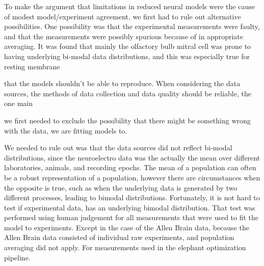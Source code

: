 To make the argument that limitations in reduced neural models were the cause of modest model/experiment agreement, we first had to rule out alternative possibilities. One possibility was that the experimental measurements were faulty, and that the measurements were possibly spurious because of in appropriate averaging. It was found that mainly the olfactory bulb mitral cell was prone to having underlying bi-modal data distributions, and this was especially true for resting membrane

that the models shouldn't be able to reproduce. When considering the data sources, the methods of data collection and data quality should be reliable, the one main 

we first needed to exclude the possibility that there might be something wrong with the data, we are fitting models to.

We needed to rule out was that the data sources did not reflect bi-modal distributions, since the neuroelectro data was the actually the mean over different laboratories, animals, and recording epochs. The mean of a population can often be a robust representation of a population, however there are circumstances when the opposite is true, such as when the underlying data is generated by two different processes, leading to bimodal distributions. Fortunately, it is not hard to test if experimental data, has an underlying bimodal distribution. That test was performed using human judgement for all measurements that were used to fit the model to experiments. Except in the case of the Allen Brain data, because the Allen Brain data consisted of individual raw experiments, and population averaging did not apply. For measurements used in the elephant optimization pipeline.

